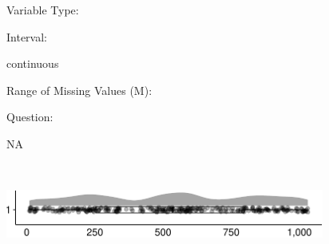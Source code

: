 \documentclass[
]{article}
\begin{document}
\begin{minipage}[t]{0.3\linewidth}

Variable Type:

\end{minipage}%
\begin{minipage}[t]{0.7\linewidth}

\end{minipage}

\begin{minipage}[t]{0.3\linewidth}

Interval:

\end{minipage}%
\begin{minipage}[t]{0.7\linewidth}

continuous

\end{minipage}

\begin{minipage}[t]{0.3\linewidth}

Range of Missing Values (M):

\end{minipage}%
\begin{minipage}[t]{0.7\linewidth}

\end{minipage}

\begin{minipage}[t]{0.3\linewidth}

Question:

\end{minipage}%
\begin{minipage}[t]{0.7\linewidth}

NA

\end{minipage}

\begin{minipage}[t]{0.3\linewidth}

~

\end{minipage}%
\begin{minipage}[t]{0.7\linewidth}

\includegraphics[width=396px]{codebook_template_files/figure-latex/parent_index_rainplot-1}

\end{minipage}
 \vspace*{-6mm} 
\end{document}
